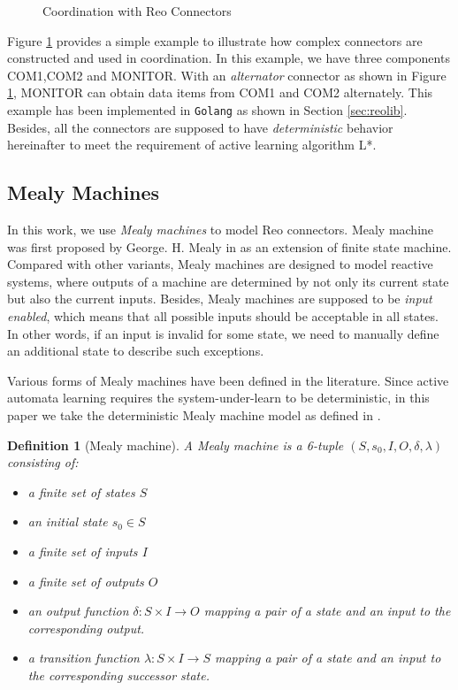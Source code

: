 \documentclass[conference, a4paper]{IEEEtran}
\newtheorem{definition}{Definition}
\begin{document}
\begin{figure}[ht]
  \begin{center}
    
  \end{center}
  \caption{Coordination with Reo Connectors}
  \label{fig:reoconnector}
\end{figure}

Figure \ref{fig:reoconnector} provides a simple example to illustrate how complex
connectors are constructed and used in coordination. In this example, we have three components
COM1,COM2 and MONITOR. With an \emph{alternator} connector as shown in Figure
\ref{fig:reoconnector}, MONITOR can obtain data items from COM1 and COM2 alternately. This example
has been implemented in \texttt{Golang} as shown in Section \ref{sec:reolib}.
Besides, all the connectors are supposed to have \emph{deterministic} behavior hereinafter to meet
the requirement of active learning algorithm L*.


\subsection{Mealy Machines} 

In this work, we use \emph{Mealy machines} to model Reo connectors.
Mealy machine was first proposed by George. H. Mealy in \cite{George1955A} as an extension of finite
state machine. Compared with other variants, Mealy machines are designed to model
reactive systems, where outputs of a machine are determined by not only its current state but also
the current inputs. Besides, Mealy machines are supposed to be \emph{input enabled}, which means
that all possible inputs should be acceptable in all states. In other words, if an input is invalid
for some state, we need to manually define an additional state to describe such exceptions.

Various forms of Mealy machines have been defined in the
literature\cite{George1955A,DBLP:journals/jcss/Broy14,DBLP:conf/sfm/SteffenHM11}. 
Since active automata learning requires the system-under-learn to be deterministic, in
this paper we take the deterministic Mealy machine model as defined in 
\cite{DBLP:conf/sfm/SteffenHM11}. 

\begin{definition}[Mealy machine]
  A Mealy machine is a 6-tuple $(S, s_0, I, O, \delta, \lambda)$ consisting of:
  \begin{itemize}
    \item[-] a finite set of states $S$
    \item[-] an initial state $s_0\in S$
    \item[-] a finite set of inputs $I$
    \item[-] a finite set of outputs $O$
    \item[-] an output function $\delta : S \times  I \rightarrow O$ mapping a pair
      of a state and an input to the corresponding output.
    \item[-] a transition function $\lambda : S \times I \rightarrow S$ mapping a pair of a
      state and an input to the corresponding successor state.
  \end{itemize}
\end{definition}
\end{document}

